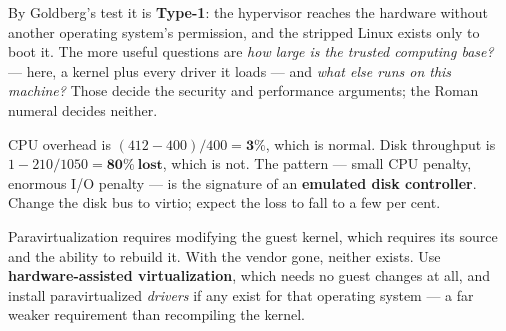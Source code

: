 \begin{ans}
  \item By Goldberg's test it is \textbf{Type-1}: the hypervisor reaches the
        hardware without another operating system's permission, and the stripped
        Linux exists only to boot it. The more useful questions are
        \emph{how large is the trusted computing base?} --- here, a kernel plus
        every driver it loads --- and \emph{what else runs on this machine?}
        Those decide the security and performance arguments; the Roman numeral
        decides neither.
  \item CPU overhead is $(412-400)/400 = \mathbf{3\%}$, which is normal. Disk
        throughput is $1 - 210/1050 = \mathbf{80\%\ lost}$, which is not. The
        pattern --- small CPU penalty, enormous I/O penalty --- is the signature
        of an \textbf{emulated disk controller}. Change the disk bus to virtio;
        expect the loss to fall to a few per cent.
  \item Paravirtualization requires modifying the guest kernel, which requires
        its source and the ability to rebuild it. With the vendor gone, neither
        exists. Use \textbf{hardware-assisted virtualization}, which needs no
        guest changes at all, and install paravirtualized \emph{drivers} if any
        exist for that operating system --- a far weaker requirement than
        recompiling the kernel.
\end{ans}

